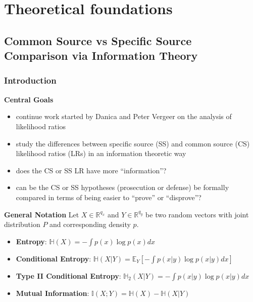 \documentclass[]{book}
\providecommand{\tightlist}{%
  \setlength{\itemsep}{0pt}\setlength{\parskip}{0pt}}
\begin{document}
\hypertarget{theoretical-foundations}{%
\chapter{Theoretical foundations}\label{theoretical-foundations}}

\hypertarget{common-source-vs-specific-source-comparison-via-information-theory}{%
\section{Common Source vs Specific Source Comparison via Information Theory}\label{common-source-vs-specific-source-comparison-via-information-theory}}

\hypertarget{introduction}{%
\subsection{Introduction}\label{introduction}}

\textbf{Central Goals}

\begin{itemize}
\tightlist
\item
  continue work started by Danica and Peter Vergeer on the analysis of likelihood ratios
\item
  study the differences between specific source (SS) and common source (CS) likelihood ratios (LRs) in an information theoretic way
\item
  does the CS or SS LR have more ``information''?
\item
  can be the CS or SS hypotheses (prosecution or defense) be formally compared in terms of being easier to ``prove'' or ``disprove''?
\end{itemize}

\textbf{General Notation}
Let \(X \in \mathbb{R}^{q_x}\) and \(Y \in \mathbb{R}^{q_y}\) be two random vectors with joint distribution \(P\) and corresponding density \(p\).

\begin{itemize}
\tightlist
\item
  \textbf{Entropy}: \(\mathbb{H}(X) = -\int{p(x) \log p(x) dx}\)
\item
  \textbf{Conditional Entropy}: \(\mathbb{H}(X|Y) = \mathbb{E}_{Y}\left[-\int{p(x|y) \log p(x|y) dx}\right]\)
\item
  \textbf{Type II Conditional Entropy}: \(\mathbb{H}_{2}(X|Y) = -\int{p(x|y) \log p(x|y) dx}\)
\item
  \textbf{Mutual Information}: \(\mathbb{I}(X;Y) = \mathbb{H}(X) - \mathbb{H}(X|Y)\)
\end{itemize}
\end{document}
